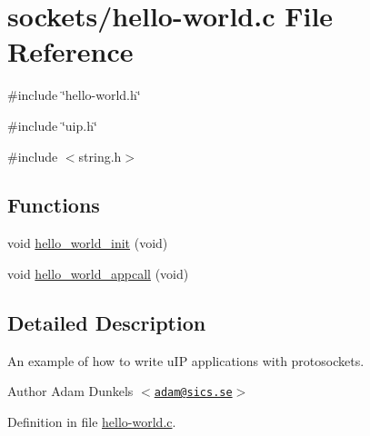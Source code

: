 \hypertarget{hello-world_8c}{
\section{sockets/hello-\/world.c File Reference}
\label{hello-world_8c}
}
{\ttfamily \#include \char`\"{}hello-\/world.h\char`\"{}}\par
{\ttfamily \#include \char`\"{}uip.h\char`\"{}}\par
{\ttfamily \#include $<$string.h$>$}\par
\subsection*{Functions}
\begin{DoxyCompactItemize}
\item 
void \hyperlink{group__helloworld_gab97849f0d3ea858eee790b69591e6427}{hello\_\-world\_\-init} (void)
\item 
void \hyperlink{group__helloworld_ga03070adbf8faab0f34f87c1270964306}{hello\_\-world\_\-appcall} (void)
\end{DoxyCompactItemize}


\subsection{Detailed Description}
An example of how to write uIP applications with protosockets. \begin{DoxyAuthor}{Author}
Adam Dunkels $<$\href{mailto:adam@sics.se}{\tt adam@sics.se}$>$ 
\end{DoxyAuthor}


Definition in file \hyperlink{hello-world_8c_source}{hello-\/world.c}.

